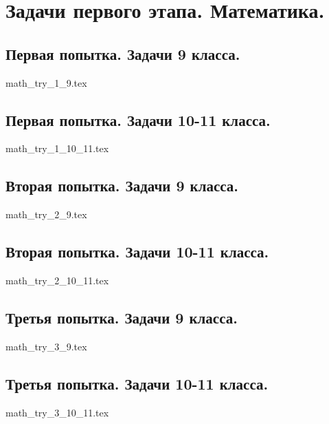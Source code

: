 \chapter{Задачи первого этапа. Математика.}

\section{Первая попытка. Задачи 9 класса.}

{math_try_1_9.tex}

\section{Первая попытка. Задачи 10-11 класса.}

{math_try_1_10_11.tex}

\section{Вторая попытка. Задачи 9 класса.}

{math_try_2_9.tex}

\section{Вторая попытка. Задачи 10-11 класса.}

{math_try_2_10_11.tex}

\section{Третья попытка. Задачи 9 класса.}

{math_try_3_9.tex}

\section{Третья попытка. Задачи 10-11 класса.}

{math_try_3_10_11.tex}
